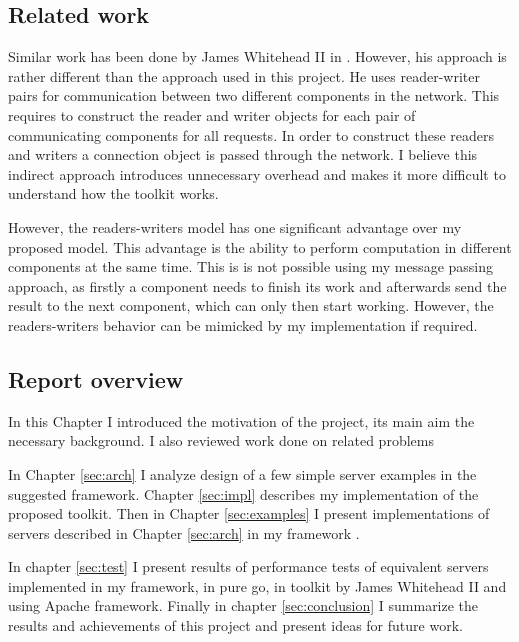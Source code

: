 \documentclass[12pt,a4paper]{article}
\begin{document}
\subsection{Related work}
Similar work has been done by James Whitehead II in \cite{whitehead}.
However, his approach is rather different than the approach used 
in this project. He uses reader-writer pairs for communication between
two different components in the network. This requires to construct the
reader and writer objects for each pair of communicating components
for all requests.
In order to construct these readers and writers a connection object is 
passed through the network.
I believe this indirect approach introduces unnecessary overhead and 
makes it more difficult to understand how the toolkit works.

However, the readers-writers model has one significant advantage over
my proposed model. This advantage is the ability to
perform computation in different components at the same time. This is
is not possible using my message passing approach, as firstly a 
component needs to finish its work and afterwards send the result to the next
component, which can only then start working.
However, the readers-writers behavior can be mimicked by my implementation 
if required.

\subsection{Report overview}
In this Chapter I introduced the motivation of the project, its main
aim the necessary background. I also reviewed work done on related 
problems

In Chapter \ref{sec:arch} I analyze design of a few simple server examples 
in the suggested framework. Chapter \ref{sec:impl} describes my implementation
of the proposed toolkit. Then in Chapter \ref{sec:examples} I present
implementations of servers described in Chapter \ref{sec:arch} in my framework .

In chapter \ref{sec:test} I present results of performance tests of equivalent 
servers implemented in my framework, in pure go, in toolkit by James Whitehead II
\cite{whitehead} and using Apache framework. Finally in chapter 
\ref{sec:conclusion} I summarize the results and achievements of this 
project and present ideas for future work.

\end{document}
